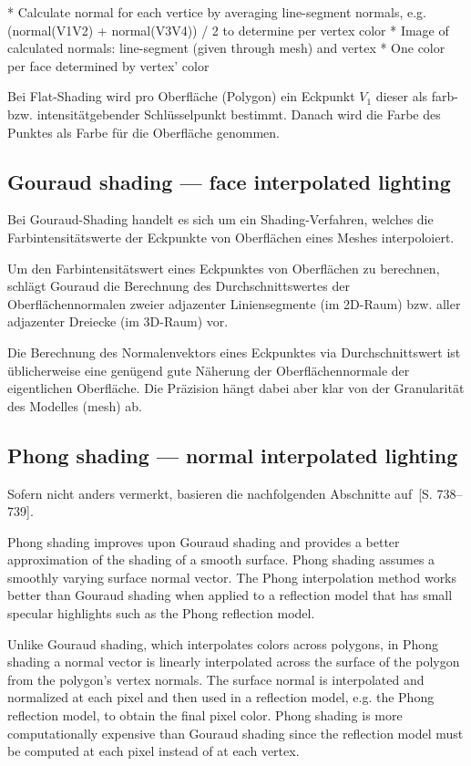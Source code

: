 * Calculate normal for each vertice by averaging line-segment normals, e.g.
  (normal(V1V2) + normal(V3V4)) / 2 to determine per vertex color
  * Image of calculated normals: line-segment (given through mesh) and vertex
* One color per face determined by vertex' color

Bei Flat-Shading wird pro Oberfläche (Polygon) ein Eckpunkt $V_{1}$ dieser als
farb- bzw. intensitätgebender Schlüsselpunkt bestimmt. Danach wird die Farbe
des Punktes als Farbe für die Oberfläche genommen.

\subsection{Gouraud shading --- face interpolated lighting}
\label{subsec:gouraud_shading}

Bei Gouraud-Shading handelt es sich um ein Shading-Verfahren, welches die
Farbintensitätswerte der Eckpunkte von Oberflächen eines Meshes interpoloiert.

Um den Farbintensitätswert eines Eckpunktes von Oberflächen  zu berechnen,
schlägt Gouraud die Berechnung des Durchschnittswertes der Oberflächennormalen
zweier adjazenter Liniensegmente (im 2D-Raum) bzw.  aller adjazenter Dreiecke
(im 3D-Raum) vor.


Die Berechnung des Normalenvektors eines Eckpunktes via Durchschnittswert ist
üblicherweise eine genügend gute Näherung der Oberflächennormale der
eigentlichen Oberfläche. Die Präzision hängt dabei aber klar von der
Granularität des Modelles (mesh) ab.

\subsection{Phong shading --- normal interpolated lighting}
\label{subsec:phong_shading}

Sofern nicht anders vermerkt, basieren die nachfolgenden Abschnitte
auf~\cite{foley_computer_1996}[S. 738–739].


Phong shading improves upon Gouraud shading and provides a better approximation
of the shading of a smooth surface. Phong shading assumes a smoothly varying
surface normal vector. The Phong interpolation method works better than Gouraud
shading when applied to a reflection model that has small specular highlights
such as the Phong reflection model.

Unlike Gouraud shading, which interpolates colors across polygons, in Phong
shading a normal vector is linearly interpolated across the surface of the
polygon from the polygon's vertex normals. The surface normal is interpolated
and normalized at each pixel and then used in a reflection model, e.g. the
Phong reflection model, to obtain the final pixel color. Phong shading is more
computationally expensive than Gouraud shading since the reflection model must
be computed at each pixel instead of at each vertex.
